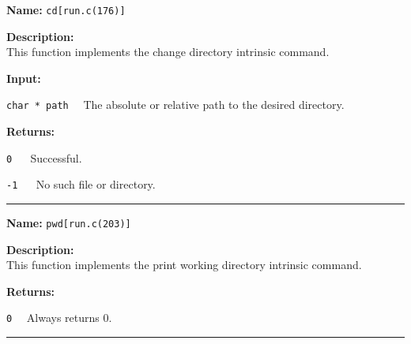 \documentclass[11pt,a4paper]{article}
\begin{document}
\begin{description}
\item \textbf{Name:} 
\verb|cd[run.c(176)]|

\item \textbf{Description:}\\
This function implements the change directory intrinsic command.

\item \textbf{Input:}
\begin{description}
\item \verb|char * path|~~ The absolute or relative path to the desired directory.
\end{description}

\item \textbf{Returns:}
\begin{description}
\item \verb|0| ~~ Successful.
\item \verb|-1| ~~ No such file or directory.
\end{description}
\end{description}\hrule

\begin{description}
\item \textbf{Name:} 
\verb|pwd[run.c(203)]|

\item \textbf{Description:}\\
This function implements the print working directory intrinsic command.

\item \textbf{Returns:}
\begin{description}
\item \verb|0|~~ Always returns 0.
\end{description}
\end{description}\hrule
\end{document}
